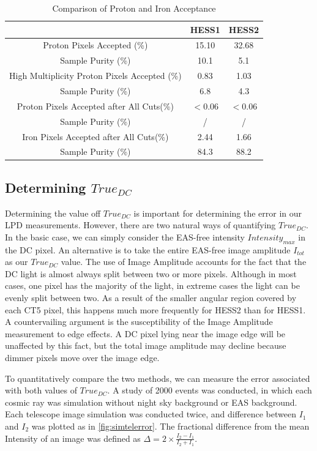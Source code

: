 \documentclass{article}
\begin{document}
\begin{table}[h!]
  \centering
  \caption{Comparison of Proton and Iron Acceptance}
  \label{tab:protonacceptance}
  \begin{tabular}{ccc}
    \toprule
    & HESS1  & HESS2 \\
    \midrule
    Proton Pixels Accepted (\%) & 15.10 & 32.68\\
    Sample Purity (\%) & 10.1 & 5.1 \\
    \midrule
    High Multiplicity Proton Pixels Accepted (\%) & 0.83 & 1.03\\
    Sample Purity (\%) & 6.8 & 4.3 \\
    \midrule
    Proton Pixels Accepted after All Cuts(\%) & $< 0.06$ & $< 0.06$\\
    Sample Purity (\%) & / & / \\
    \midrule
    Iron Pixels Accepted after All Cuts(\%) & 2.44 & 1.66\\
    Sample Purity (\%) & 84.3 & 88.2 \\
    \bottomrule
  \end{tabular}
\end{table}

\subsection{Determining $True_{DC}$}
Determining the value off $True_{DC}$ is important for determining the error in our LPD measurements. However, there are two natural ways of quantifying $True_{DC}$. In the basic case, we can simply consider the EAS-free intensity $Intensity_{max}$ in the DC pixel. An alternative is to take the entire EAS-free image amplitude $I_{tot}$ as our $True_{DC}$ value. The use of Image Amplitude accounts for the fact that the DC light is almost always split between two or more pixels. Although in most cases, one pixel has the majority of the light, in extreme cases the light can be evenly split between two. As a result of the smaller angular region covered by each CT5 pixel, this happens much more frequently for HESS2 than for HESS1. A countervailing argument is the susceptibility of the Image Amplitude measurement to edge effects. A DC pixel lying near the image edge will be unaffected by this fact, but the total image amplitude may decline because dimmer pixels move over the image edge.

To quantitatively compare the two methods, we can measure the error associated with both values of $True_{DC}$. A study of 2000 events was conducted, in which each cosmic ray was simulation without night sky background or EAS background. Each telescope image simulation was conducted twice, and difference between $I_{1}$ and $I_{2}$ was plotted as in \ref{fig:simtelerror}. The fractional difference from the mean Intensity of an image was defined as $\Delta = 2 \times \frac{I_{2} - I_{1}}{{I_{2} + I_{1}}}$. 
\end{document}
